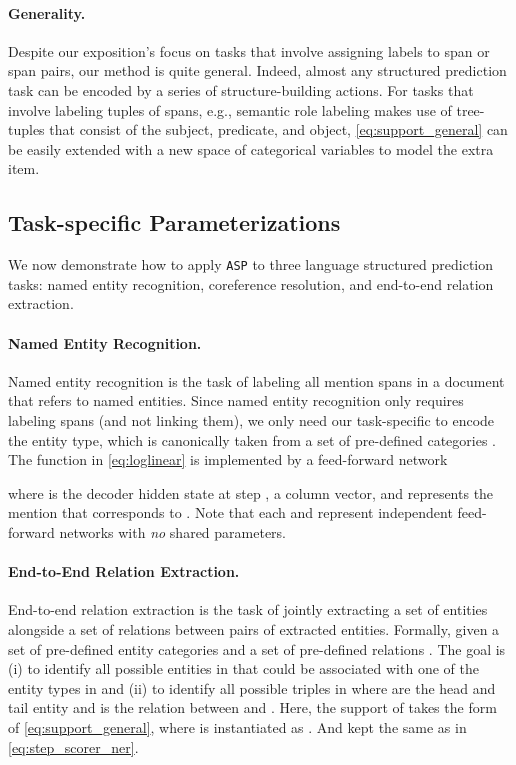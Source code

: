 \documentclass[11pt]{article}
\newcommand*{\asp}{\texttt{ASP}}
\begin{document}
\paragraph{Generality.}
Despite our exposition's focus on tasks that involve assigning labels to span or span pairs, our method is quite general. 
Indeed, almost any structured prediction
task can be encoded by a series of structure-building actions.
For tasks that involve labeling tuples of spans, e.g., semantic role labeling makes use of tree-tuples that consist of the subject, predicate, and object, \cref{eq:support_general} can be easily extended with a new space of categorical variables  to model the extra item.

\subsection{Task-specific Parameterizations} \label{sec:instantiation}
We now demonstrate how to apply \asp{} to three language structured prediction tasks: 
named entity recognition, coreference resolution, and end-to-end relation extraction.

\paragraph{Named Entity Recognition.} 
Named entity recognition is the task of labeling all mention spans   in a document  that refers to named entities. 
Since named entity recognition only requires labeling spans (and not linking them), we only need our task-specific  to encode the entity type, which is canonically taken from a set of pre-defined categories .
The function  in \cref{eq:loglinear} is implemented by a feed-forward network

where  is the decoder hidden state at step , a column vector, and  represents the mention that corresponds to .
Note that each  and  represent independent feed-forward networks with \emph{no} shared parameters.

\paragraph{End-to-End Relation Extraction.} 
End-to-end relation extraction is the task of jointly extracting a set of entities alongside a set of relations between pairs of extracted entities.
Formally, given a set of pre-defined entity categories  and a set of pre-defined relations .
The goal is (i) to identify all possible entities  in  that could be associated with one of the entity types  in  and (ii) to identify all possible triples  in  where  are the head and tail entity and  is the relation between  and . 
Here, the support of  takes the form of \cref{eq:support_general}, where  is instantiated as . 
And  kept the same as in \cref{eq:step_scorer_ner}.
\end{document}
